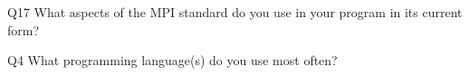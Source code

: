\begin{description}%
\item{Q17} What aspects of the MPI standard do you use in your program in its current form?%
\item{Q4} What programming language(s) do you use most often?%
\end{description}%
